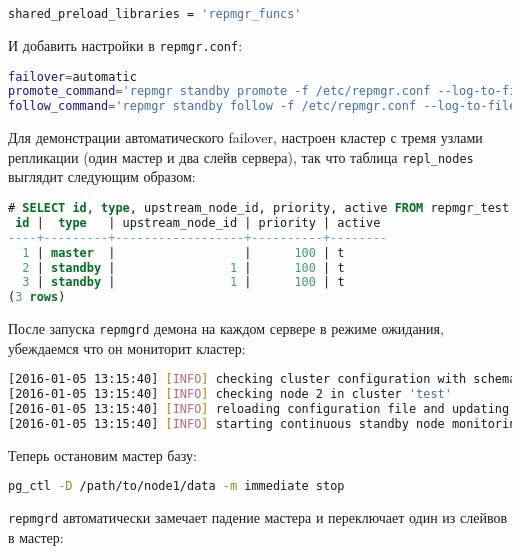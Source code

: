 \begin{lstlisting}[language=Bash,label=lst:repmgr1,caption=repmgr\_funcs]
shared_preload_libraries = 'repmgr_funcs'
\end{lstlisting}

И добавить настройки в \lstinline!repmgr.conf!:

\begin{lstlisting}[language=Bash,label=lst:repmgr2,caption=repmgr.conf]
failover=automatic
promote_command='repmgr standby promote -f /etc/repmgr.conf --log-to-file'
follow_command='repmgr standby follow -f /etc/repmgr.conf --log-to-file'
\end{lstlisting}

Для демонстрации автоматического failover, настроен кластер с тремя узлами репликации (один мастер и два слейв сервера), так что таблица \lstinline!repl_nodes! выглядит следующим образом:

\begin{lstlisting}[language=SQL,label=lst:repmgr3,caption=repl\_nodes]
# SELECT id, type, upstream_node_id, priority, active FROM repmgr_test.repl_nodes ORDER BY id;
 id |  type   | upstream_node_id | priority | active
----+---------+------------------+----------+--------
  1 | master  |                  |      100 | t
  2 | standby |                1 |      100 | t
  3 | standby |                1 |      100 | t
(3 rows)
\end{lstlisting}

После запуска \lstinline!repmgrd! демона на каждом сервере в режиме ожидания, убеждаемся что он мониторит кластер:

\begin{lstlisting}[language=Bash,label=lst:repmgr4,caption=logs]
[2016-01-05 13:15:40] [INFO] checking cluster configuration with schema 'repmgr_test'
[2016-01-05 13:15:40] [INFO] checking node 2 in cluster 'test'
[2016-01-05 13:15:40] [INFO] reloading configuration file and updating repmgr tables
[2016-01-05 13:15:40] [INFO] starting continuous standby node monitoring
\end{lstlisting}

Теперь остановим мастер базу:

\begin{lstlisting}[language=Bash,label=lst:repmgr5,caption=Остановка текущего мастера]
pg_ctl -D /path/to/node1/data -m immediate stop
\end{lstlisting}

\lstinline!repmgrd! автоматически замечает падение мастера и переключает один из слейвов в мастер:

